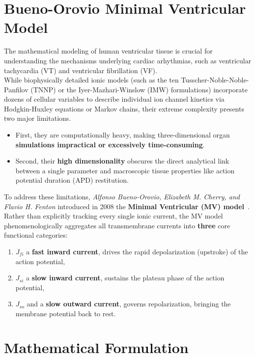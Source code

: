 \documentclass{Configuration_Files/PoliMi3i_thesis}
\begin{document}
\section{Bueno-Orovio Minimal Ventricular Model}
The mathematical modeling of human ventricular tissue is crucial for understanding the mechanisms underlying cardiac arhythmias, such as ventricular tachycardia (VT) and ventricular fibrillation (VF). \\While biophysically detailed ionic models (such as the ten Tusscher-Noble-Noble-Panfilov (TNNP) or the Iyer-Mazhari-Winslow (IMW) formulations) incorporate dozens of cellular variables to describe individual ion channel kinetics via Hodgkin-Huxley equations or Markov chains, their extreme complexity presents two major limitations. 
\begin{itemize}
    \item First, they are computationally heavy, making three-dimensional organ \textbf{simulations impractical or excessively time-consuming}.
    \item Second, their \textbf{high dimensionality} obscures the direct analytical link between a single parameter and macroscopic tissue properties like action potential duration (APD) restitution.
\end{itemize} 
To address these limitations, \textit{Alfonso Bueno-Orovio, Elizabeth M. Cherry, and Flavio H. Fenton} introduced in 2008 the \textbf{Minimal Ventricular (MV) model}~\cite{buenoorovio2008}. Rather than explicitly tracking every single ionic current, the MV model phenomenologically aggregates all transmembrane currents into \textbf{three} core functional categories:
\begin{enumerate}
    \item $J_{fi}$ a \textbf{fast inward current}, drives the rapid depolarization (upstroke) of the action potential,
    \item $J_{si}$ a \textbf{slow inward current}, sustains the plateau phase of the action potential,
    \item $J_{so}$ and a \textbf{slow outward current}, governs repolarization, bringing the membrane potential back to rest. 
\end{enumerate} 

\newpage
\section{Mathematical Formulation}
\end{document}
